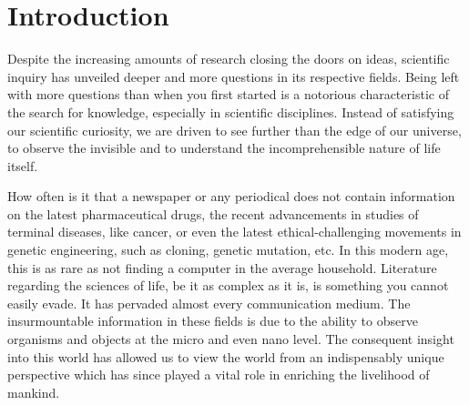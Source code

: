 
\chapter{Introduction} %

\label{chap:Chapter1} %


Despite the increasing amounts of research closing the doors on ideas, scientific inquiry has unveiled deeper and more questions in its respective fields. 
Being left with more questions than when you first started is a notorious characteristic of the search for knowledge, especially in scientific disciplines. 
Instead of satisfying our scientific curiosity, we are driven to see further than the edge of our universe, to observe the invisible and to understand the incomprehensible nature of life itself.

How often is it that a newspaper or any periodical does not contain information on the latest pharmaceutical drugs, the recent advancements in studies of terminal diseases, like cancer, or even the latest ethical-challenging movements in genetic engineering, such as cloning, genetic mutation, etc. 
In this modern age, this is as rare as not finding a computer in the average household. 
Literature regarding the sciences of life, be it as complex as it is, is something you cannot easily evade. 
It has pervaded almost every communication medium. 
The insurmountable information in these fields is due to the ability to observe organisms and objects at the micro and even nano level. 
The consequent insight into this world has allowed us to view the world from an indispensably unique 
perspective which has since played a vital role in enriching the livelihood of mankind. 

